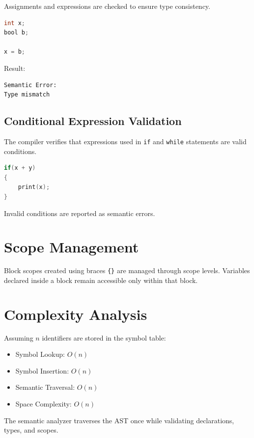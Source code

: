 \documentclass[12pt,a4paper]{report}
\begin{document}
Assignments and expressions are checked to ensure type consistency.

\begin{lstlisting}[language=C]
int x;
bool b;

x = b;
\end{lstlisting}

Result:

\begin{lstlisting}
Semantic Error:
Type mismatch
\end{lstlisting}

\subsection{Conditional Expression Validation}

The compiler verifies that expressions used in \texttt{if} and \texttt{while} statements are valid conditions.

\begin{lstlisting}[language=C]
if(x + y)
{
    print(x);
}
\end{lstlisting}

Invalid conditions are reported as semantic errors.

\section{Scope Management}

Block scopes created using braces \texttt{\{\}} are managed through scope levels. Variables declared inside a block remain accessible only within that block.

\section{Complexity Analysis}

Assuming \(n\) identifiers are stored in the symbol table:

\begin{itemize}
    \item Symbol Lookup: \(O(n)\)
    \item Symbol Insertion: \(O(n)\)
    \item Semantic Traversal: \(O(n)\)
    \item Space Complexity: \(O(n)\)
\end{itemize}

The semantic analyzer traverses the AST once while validating declarations, types, and scopes.
\end{document}
